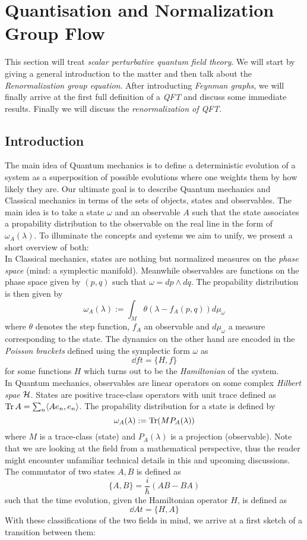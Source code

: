 \section{Quantisation and Normalization Group Flow}
\label{sec:Renormalization}

This section will treat \emph{scalar perturbative quantum field theory}. We will start by giving a general introduction to the matter and then talk about the \emph{Renormalization group equation}. After introducting \emph{Feynman graphs}, we will finally arrive at the first full definition of a \emph{QFT} and discuss some immediate results. Finally we will discuss the \emph{renormalization of QFT}.

\subsection{Introduction}
\label{subsec:quantisation_intro}

The main idea of Quantum mechanics is to define a deterministic evolution of a system as a superposition of possible evolutions where one weights them by how likely they are. Our ultimate goal is to describe Quantum mechanics and Classical mechanics in terms of the sets of objects, states and observables. The main idea is to take a state $\omega$ and an observable $A$ such that the state associates a propability distribution to the observable on the real line in the form of $\omega_A(\lambda)$. To illuminate the concepts and systems we aim to unify, we present a short overview of both:\\

In Classical mechanics, states are nothing but normalized measures on the \emph{phase space} (mind: a symplectic manifold). Meanwhile observables are functions on the phase space given by $(p,q)$ such that $\omega = dp \wedge dq$. The propability distribution is then given by
$$ \omega_A (\lambda) := \int_M \theta(\lambda - f_A (p,q)) d \mu_\omega$$
where $\theta$ denotes the step function, $f_A$ an observable and $d\mu_\omega$ a measure corresponding to the state. The dynamics on the other hand are encoded in the \emph{Poisson brackets} defined using the symplectic form $\omega$ as
$$ \dd{f}{t} = \{H, f\} $$
for some functions $H$ which turns out to be the \emph{Hamiltonian} of the system.\\

In Quantum mechanics, observables are linear operators on some complex \emph{Hilbert spae} ${\mathcal{H}}$. States are positive trace-class operators with unit trace defined as $\operatorname{Tr} A = \sum_n \langle A e_n, e_n \rangle$. The propability distribution for a state is defined by
$$ \omega_A (\lambda) := \operatorname{Tr}(M P_A(\lambda)) $$
where $M$ is a trace-class (state) and $P_A(\lambda)$ is a projection (observable). Note that we are looking at the field from a mathematical perspective, thus the reader might encounter unfamiliar technical details in this and upcoming discussions.\\
The commutator of two states $A,B$ is defined as
$$ \{A,B\} = \frac{i}{\hbar} (AB-BA) $$
such that the time evolution, given the Hamiltonian operator $H$, is defined as
$$ \dd{A}{t} = \{H,A\} $$
With these classifications of the two fields in mind, we arrive at a first sketch of a transition between them:

